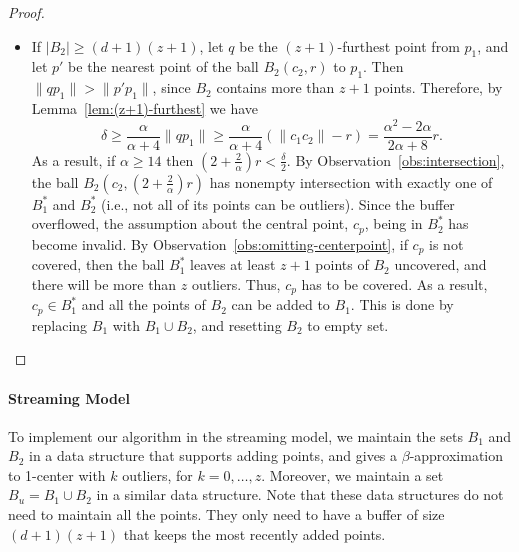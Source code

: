 \documentclass[envcountsame]{cls/cccg15}
\newcommand{\rc}{r}
\newcommand{\cp}{c_p}
\newcommand{\dz}{(d + 1)(z + 1)}
\newcommand{\card}[1]{\left|{#1}\right|}
\newcommand{\len}[1]{\|{#1}\|}
\newcommand{\gee}{\geqslant}
\renewcommand{\geq}{\gee}
\renewcommand{\ge}{\gee}
\begin{document}
\begin{proof}
\begin{itemize}
\item 
If $\card{B_2} \ge \dz$, let $q$ be the $(z+1)$-furthest point from $p_1$,
and let $p'$ be the nearest point of the ball $B_2(c_2, \rc )$ to $p_1$. 
Then $\len{qp_1} > \len{p'p_1}$, since $B_2$ contains more than $z+1$ points. 
Therefore, by Lemma~\ref{lem:(z+1)-furthest} we have
\[
\delta \ge \frac{\alpha }{\alpha+4}\len{qp_1} \ge \frac{\alpha}{\alpha+4} (\len{c_1c_2} - \rc ) = \frac{\alpha^2 - 2\alpha}{2\alpha + 8} \rc.
\]
As a result, if $\alpha \geq 14$ then $(2 + \frac{2}{\alpha}) \rc  < \frac{\delta}{2}$. 
By Observation~\ref{obs:intersection}, the ball $B_2(c_2, (2 + \frac{2}{\alpha}) \rc )$ 
has nonempty intersection with exactly one of $B_1^*$ and $B_2^*$ 
(i.e., not all of its points can be outliers). 
Since the buffer overflowed, the assumption about the central point, 
$\cp$, being in $B_2^*$ has become invalid. 
By Observation~\ref{obs:omitting-centerpoint}, if $\cp$ is not covered, 
then the ball $B_1^*$ leaves at least $z+1$ points of $B_2$ uncovered, 
and there will be more than $z$ outliers. 
Thus, $\cp$ has to be covered. 
As a result, $\cp \in B_1^*$ and all the points of $B_2$ can be added to $B_1$. 
This is done by replacing $B_1$ with $B_1 \cup B_2$, and resetting $B_2$ to empty set.
\end{itemize}
\end{proof}





\paragraph{Streaming Model}
To implement our algorithm in the streaming model,
we maintain the sets $B_1$ and $B_2$ 
in a data structure that supports adding points,
and gives a $\beta$-approximation to 1-center with $k$ outliers, for $k=0,\dots,z$.
Moreover, we maintain a set $B_u = B_1 \cup B_2$ in a similar data structure.
Note that these data structures do not need to maintain all the points. 
They only need to have a buffer of size $\dz$ that keeps the most recently added points.
\end{document}
